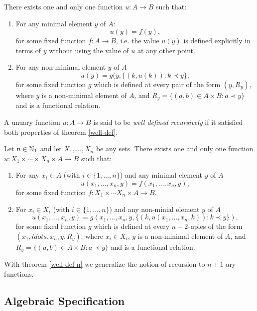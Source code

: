 \begin{theorem} \label{well-def}
	There exists one and only one function $u : A \to B$ such that:
	\begin{enumerate}
	\item 
		For any minimal element $y$ of $A$:
		\[ u(y) = f(y), \]
		for some fixed function $f : A \to B$, i.e. the value $u(y)$ is defined explicitly in terms of $y$ without using the value of $u$ at any other point.
	\item
		For any non-minimal element $y$ of $A$
		\[u(y) = g(y, \{(k, u(k)) : k \prec y \}, \]
		for some fixed function $g$ which is defined at every pair of the form $(y, R_y)$, where $y$ is a non-minimal element of $A$, and $R_y = \{ (a,b) \in A \times B : a \prec y \}$
		and is a functional relation.
	\end{enumerate}
\end{theorem}
A unuary function $u : A \to B$ is said to be \emph{well defined recursively} if it satisfied both properties of theorem \ref{well-def}.

\begin{theorem}\label{well-def-n}
	Let $n \in \mathbb{N}_1$ and let $X_1, \ldots, X_n$ be any sets. There exists one and only one function $u: X_1 \times \cdots \times X_n \times A \to B$ such that:
	\begin{enumerate}
		\item For any $x_i \in A$ (with $i \in \{1, \ldots, n\}$) and any minimal element $y$ of $A$
			\[
			u(x_1, \ldots, x_n, y) = f(x_1, \ldots, x_n, y),
			\]
			for some fixed function $f : X_1 \times \cdots X_n \times A \to B$.
		\item
			For $x_i \in X_i$ (with $i \in \{ 1, \ldots, n \}$) and any non-minial element $y$ of $A$
			\[
			u(x_1, \ldots, x_n,y) = g(x_1, \ldots, x_n,y, \{(k, u(x_1, \ldots, x_n,k)) : k \prec y\}),
			\]
			for some fixed function $g$ which is defined at every $n+2$-uples of the form $(x_1, ldots, x_n,y, R_y)$, where $x_i \in X_i$, $y$ is a non-minimal element of $A$, and $R_y = \{ (a,b) \in A \times B : a \prec y \} $ and is a functional relation.
	\end{enumerate}
\end{theorem}
With theorem \ref{well-def-n} we generalize the notion of recursion to $n+1$-ary functions.


\subsection{Algebraic Specification}

